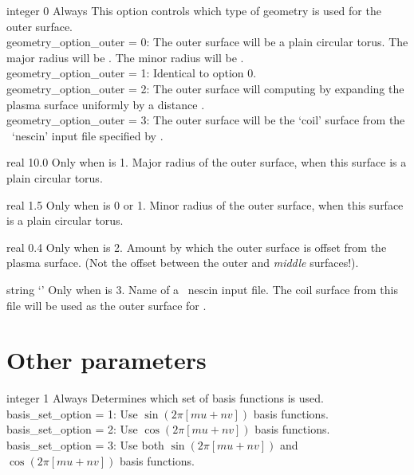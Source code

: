 {integer}
{0}
{Always}
{This option controls which type of geometry is used for the outer surface.\\

{\ttfamily geometry\_option\_outer} = 0: The outer surface will be a plain circular torus. The major radius will be .
     The minor radius will be .\\

{\ttfamily geometry\_option\_outer} = 1: Identical to option 0.\\

{\ttfamily geometry\_option\_outer} = 2: The outer surface will computing by expanding the plasma surface uniformly by a distance .\\

{\ttfamily geometry\_option\_outer} = 3: The outer surface will be the `coil' surface from the \nescoil~`nescin' input file specified by .
}

\myhrule

{real}
{10.0}
{Only when  is 1.}
{Major radius of the outer surface, when this surface is a plain circular torus.}

\myhrule

{real}
{1.5}
{Only when  is 0 or 1.}
{Minor radius of the outer surface, when this surface is a plain circular torus.}

\myhrule

{real}
{0.4}
{Only when  is 2.}
{Amount by which the outer surface is offset from the plasma surface.  (Not the offset between the outer and \emph{middle} surfaces!).}

\myhrule

{string}
{`'}
{Only when  is 3.}
{Name of a \nescoil~{\ttfamily nescin} input file. The coil surface from
this file will be used as the outer surface for \bdistrib.}

\section{Other parameters}

\myhrule

{integer}
{1}
{Always}
{Determines which set of basis functions is used.\\

{\ttfamily basis\_set\_option} = 1: Use $\sin(2 \pi [mu+nv])$ basis functions.\\

{\ttfamily basis\_set\_option} = 2: Use $\cos(2 \pi [mu+nv])$ basis functions.\\

{\ttfamily basis\_set\_option} = 3: Use both $\sin(2 \pi [mu+nv])$ and $\cos(2 \pi [mu+nv])$ basis functions.
}

